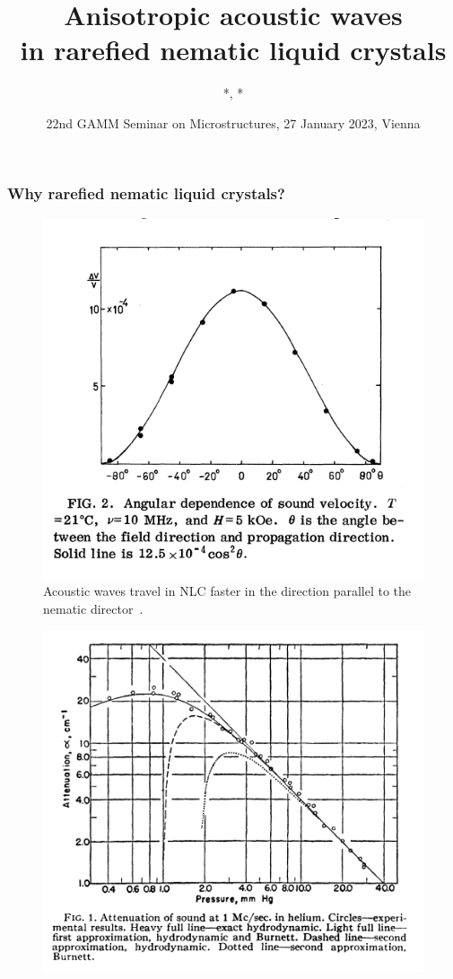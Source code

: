 \documentclass{beamer}
\title[Acoustic rarefied nematic liquid crystals]{Anisotropic acoustic waves \vspace{0.2cm}\\ in rarefied nematic liquid crystals} %
\author%
{%
	\sc{P. E. Farrell}*, \underline{\sc{U. Zerbinati}}*\\
}
\institute%
{%
	* \textit{Mathematical Institute}\\
	\;\textit{University of Oxford}\\
}
\date[Firedrake 2023]{22nd GAMM Seminar on Microstructures, 27 January 2023, Vienna} %
\begin{document}
	\begin{frame}[plain]
		\titlepage
	\end{frame}
	\begin{frame}
		\frametitle{Why rarefied nematic liquid crystals?}
		\begin{minipage}{0.49\textwidth}
			\vspace{0.8cm}
			\begin{figure}
				\includegraphics[scale=0.25]{Figures/MullenLuthiStephen}
				\vspace{-0.4cm}
				\caption{Acoustic waves travel in NLC faster in the direction parallel to the nematic director~\cite{MullenEtAll}.}
			\end{figure}
		\end{minipage}
		\begin{minipage}{0.49\textwidth}
			\vspace{1cm}
			\begin{figure}
				\includegraphics[scale=0.25]{Figures/Greenspan}

\end{figure}
\end{minipage}
\end{frame}
\end{document}
